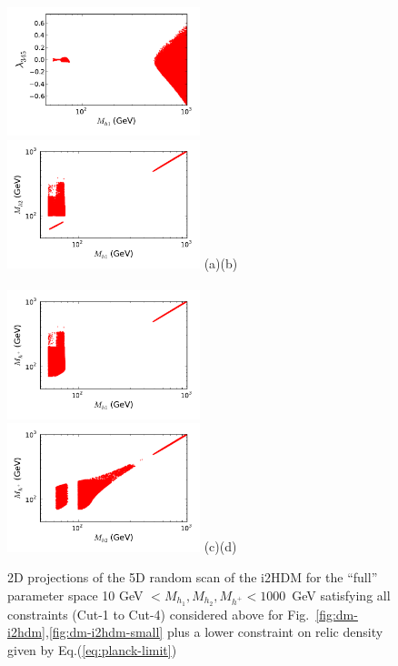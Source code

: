 \documentclass[12pt,a4paper]{article}
\begin{document}
\begin{figure}[htb]
\hspace*{-0.2cm}\includegraphics[width=0.50\textwidth]{Mh1_ld345_Omega_zoom-cut123456789_zz-large-monoc.pdf}%
\hspace*{-0.2cm}\includegraphics[width=0.50\textwidth]{Mh1_Mh2_Omega_zoom-cut123456789_zz-large-monoc.pdf}
\vskip -1.0cm
\hspace*{1cm}(a)\hspace*{0.55\textwidth}\hspace*{-1.5cm}(b)
\\
\\
\hspace*{-0.2cm}\includegraphics[width=0.50\textwidth]{Mh1_Mhc_Omega_zoom-cut123456789_zz-large-monoc.pdf}%
\hspace*{-0.2cm}\includegraphics[width=0.50\textwidth]{Mhc_Mh2_Omega_zoom-cut123456789_zz-large-monoc.pdf}
\vskip -1.0cm
\hspace*{1cm}(c)\hspace*{0.55\textwidth}\hspace*{-1.5cm}(d)
\caption{2D projections of the 5D random scan of the i2HDM for
 the ``full'' parameter space 10 GeV $< M_{h_1}, M_{h_2}, M_{h^{+}} < 1000$~GeV
satisfying all constraints (Cut-1 to Cut-4) considered above for Fig.~\ref{fig:dm-i2hdm},\ref{fig:dm-i2hdm-small}
plus a lower constraint on relic density given by  Eq.(\ref{eq:planck-limit})}
\label{fig:dm-i2hdm-relic}
\end{figure}
\end{document}
